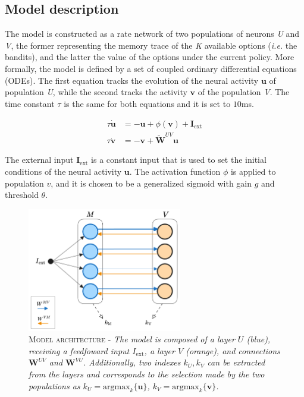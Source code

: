 
\subsection{Model description}
The model is constructed as a rate network of two populations of neurons \textit{U} and \textit{V}, the former representing the memory trace of the \textit{K} available options (\textit{i.e.} the bandits), and the latter the value of the options under the current policy.
More formally, the model is defined by a set of coupled ordinary differential equations (ODEs).
The first equation tracks the evolution of the neural activity $\textbf{u}$ of population \textit{U}, while the second tracks the activity $\textbf{v}$ of the population \textit{V}. The time constant $\tau$ is the same for both equations and it is set to $10$ms.

\begin{equation}
\begin{aligned}
    \tau \dot{\textbf{u}}&= -\textbf{u} + \phi(\textbf{v}) + \textbf{I}_{\text{ext}} \\
    \tau \dot{\textbf{v}}&= -\textbf{v} + \tilde{\textbf{W}}^{UV}\textbf{u}
\end{aligned}
\end{equation}\label{eq:main}

\noindent The external input $\textbf{I}_{\text{ext}}$ is a constant input that is used to set the initial conditions of the neural activity $\textbf{u}$. The activation function $\phi$ is applied to population $v$, and it is chosen to be a generalized sigmoid with gain $g$ and threshold $\theta$.

\begin{figure}[h]
    \centering
    \includegraphics[width=0.6\textwidth]{figures/minb_architecture.png}
    \caption{\textsc{Model architecture} - \textit{The model is composed of a layer $U$ (blue), receiving a feedfoward input $I_{\text{ext}}$, a layer $V$ (orange), and connections $\textbf{W}^{UV}$ and $\textbf{W}^{VU}$. Additionally, two indexes $k_{U}, k_{V}$  can be extracted from the layers and
    corresponds to the selection made by the two populations as $k_{U}=\text{argmax}_{k} \{\textbf{u}\}$, $k_{V}=\text{argmax}_{k} \{\textbf{v}\}$.}}
    \label{fig:main_architecture}
\end{figure}

